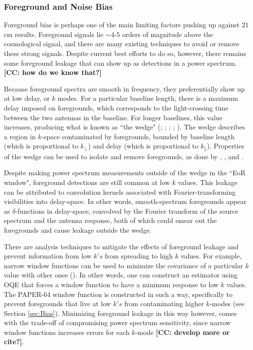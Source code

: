 \documentclass[preprint2,numberedappendix,tighten]{aastex6}  %
\newcommand{\cc}[1]{{\color{purple} \textbf{[CC: #1]}}}
\begin{document}
\subsubsection{Foreground and Noise Bias}
\label{sec:BiasTypes}

Foreground bias is perhaps one of the main limiting factors pushing up against $21$ cm results. Foreground signals lie $\sim4$-$5$ orders of magnitude above the cosmological signal, and there are many existing techniques to avoid or remove these strong signals. Despite current best efforts to do so, however, there remains some foreground leakage that can show up as detections in a power spectrum. \cc{how do we know that?} 

Because foreground spectra are smooth in frequency, they preferentially show up at low delay, or $k$ modes. For a particular baseline length, there is a maximum delay imposed on foregrounds, which corresponds to the light-crossing time between the two antennas in the baseline. For longer baselines, this value increases, producing what is known as ``the wedge" (\citealt{parsons_et_al2012b}; \citealt{liu_et_al2014a}; \citealt{liu_et_al2014b}; \citealt{vedantham_et_al2012}; \citealt{thyagarajan_et_al2013}). The wedge describes a region in $k$-space contaminated by foregrounds, bounded by baseline length (which is proportional to $k_{\perp}$) and delay (which is proportional to $k_{\parallel}$). Properties of the wedge can be used to isolate and remove foregrounds, as done by \citet{ali_et_al2015}, \citet{parsons_et_al2014}, and \citet{jacobs_et_al2015}.

Despite making power spectrum measurements outside of the wedge in the ``EoR window", foreground detections are still common at low $k$ values. This leakage can be attributed to convolution kernels associated with Fourier-transforming visibilities into delay-space. In other words, smooth-spectrum foregrounds appear as $\delta$-functions in delay-space, convolved by the Fourier transform of the source spectrum and the antenna response, both of which could smear out the foregrounds and cause leakage outside the wedge.

There are analysis techniques to mitigate the effects of foreground leakage and prevent information from low $k's$ from spreading to high $k$ values. For example, narrow window functions can be used to minimize the covariance of a particular $k$ value with other ones (\citealt{liu_et_al2014b}). In other words, one can construct an estimator using OQE that forces a window function to have a minimum response to low $k$ values. The PAPER-64 window function is constructed in such a way, specifically to prevent foregrounds that live at low $k's$ from contaminating higher $k$-modes (see Section \ref{sec:Bias}). Minimizing foreground leakage in this way however, comes with the trade-off of compromising power spectrum sensitivity, since narrow window functions increases errors for each $k$-mode \cc{develop more or cite?}. 
\end{document}
